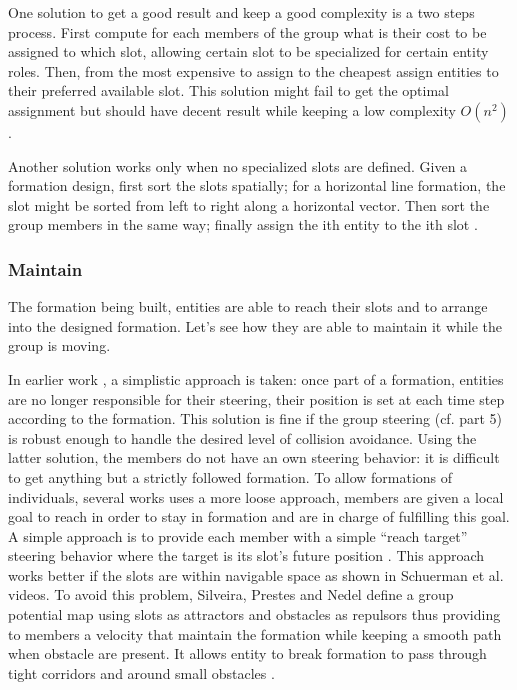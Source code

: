 \documentclass{article}
\begin{document}
One solution to get a good result and keep a good complexity is a two steps process. First compute for each members of the group what is their cost to be assigned to which slot, allowing certain slot to be specialized for certain entity roles. Then, from the most expensive to assign to the cheapest assign entities to their preferred available slot. This solution might fail to get the optimal assignment but should have decent result while keeping a low complexity $O(n^2)$
\cite{Millington:2006wz}.

Another solution works only when no specialized slots are defined. Given a formation design, first sort the slots spatially; for a horizontal line formation, the slot might be sorted from left to right along a horizontal vector. Then sort the group members in the same way; finally assign the ith entity to the ith slot \cite{Dawson:2002vd}.

\subsubsection{Maintain}

The formation being built, entities are able to reach their slots and to arrange into the designed formation. Let’s see how they are able to maintain it while the group is moving.

In earlier work \cite{Pottinger:1999vk}, a simplistic approach is taken: once part of a formation, entities are no longer responsible for their steering, their position is set at each time step according to the formation. This solution is fine if the group steering (cf. part 5) is robust enough to handle the desired level of collision avoidance.
Using the latter solution, the members do not have an own steering behavior: it is difficult to get anything but a strictly followed formation. To allow formations of individuals, several works uses a more loose approach, members are given a local goal to reach in order to stay in formation and are in charge of fulfilling this goal. A simple approach is to provide each member with a simple “reach target” steering behavior where the target is its slot’s future position \cite{Karamouzas:2010fi,Schuerman:2010um}. This approach works better if the slots are within navigable space as shown in Schuerman et al. videos. To avoid this problem, Silveira, Prestes and Nedel define a group potential map using slots as attractors and obstacles as repulsors thus providing to members a velocity that maintain the formation while keeping a smooth path when obstacle are present. It allows entity to break formation to pass through tight corridors and around small obstacles \cite{Silveira:2008bc}.
\end{document}
